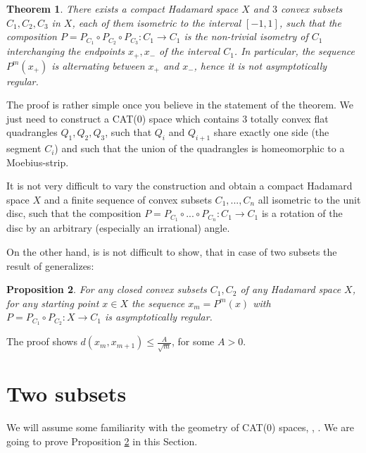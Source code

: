 \documentclass[12pt,leqno]{amsart}
\numberwithin{equation}{section}
\newtheorem{thm}{Theorem}[section]
\newtheorem{prop}[thm]{Proposition}
\theoremstyle{remark}
\begin{document}
\begin{thm}\label{thm}
There exists a compact Hadamard space $X$ and $3$ convex subsets $C_1,C_2,C_3$ in $X$, each of them isometric to the interval 
$[-1,1]$,  such that the composition $P= P_{C_1}\circ P_{C_2} \circ P_{C_3} :C_1\to C_1$ is the non-trivial isometry of $C_1$ interchanging the endpoints $x_+,x_-$ of the interval $C_1$. In particular, the sequence $P^m (x_+)$ is  alternating between $x_+$ and $x_-$, hence it is not asymptotically regular.
\end{thm}



The proof is rather simple once you believe in the statement of the theorem. We just need to construct a CAT(0) space which contains 3 totally convex  flat quadrangles $Q_1,Q_2,Q_3$, such that $Q_i$ and $Q_{i+1}$ share exactly one side (the segment $C_i$) and such that the union of the quadrangles  is homeomorphic to a Moebius-strip.   


  It is not very difficult to vary the construction and obtain a compact Hadamard space $X$ and a finite sequence of convex subsets $C_1,...,C_n$ all isometric to the unit disc, such that the composition $P=P_{C_1}\circ ...\circ      P_{C_n} :C_1\to C_1$  is a rotation of the disc by an arbitrary (especially an irrational) angle. 



On the other hand, is is  not difficult to show, that in case of two subsets the result of \cite{Bauschke} generalizes:

\begin{prop} \label{prop}
For any closed convex subsets $C_1,C_2$ of any Hadamard space $X$, for any starting point $x\in X$  the sequence $x_m = P^m (x)$ with $P=  P_{C_1}\circ P_{C_2} :X\to C_1$ is asymptotically 
regular.
\end{prop}

The proof shows   $d(x_m,x_{m+1}) \leq \frac  {A} {\sqrt m}$, for some $A>0$.






\section{Two subsets}
We will assume some familiarity with the geometry of CAT(0) spaces, \cite{BH}, \cite{AKP}.
We are going to prove Proposition \ref{prop} in this Section.
\end{document}
